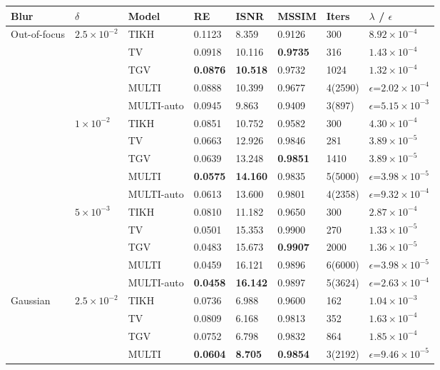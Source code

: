 \begin{tabular}{llllllll}
\toprule
Blur & $\delta$ & Model & RE & ISNR & MSSIM & Iters & $\lambda$ / $\epsilon$ \\
\midrule
\multirow{15}{*}{Out-of-focus} & \multirow{5}{*}{$2.5\times 10^{-2}$} & TIKH & 0.1123 & 8.359 & 0.9126 & 300 & $8.92\times 10^{-4}$ \\
 &  & TV & 0.0918 & 10.116 & \textbf{0.9735} & 316 & $1.43\times 10^{-4}$ \\
 &  & TGV & \textbf{0.0876} & \textbf{10.518} & 0.9732 & 1024 & $1.32\times 10^{-4}$ \\
 &  & MULTI & 0.0888 & 10.399 & 0.9677 & 4(2590) & $\epsilon$=$2.02\times 10^{-4}$ \\
 &  & MULTI-auto & 0.0945 & 9.863 & 0.9409 & 3(897) & $\epsilon$=$5.15\times 10^{-3}$ \\
\cmidrule{2-8}
 & \multirow{5}{*}{$1\times 10^{-2}$} & TIKH & 0.0851 & 10.752 & 0.9582 & 300 & $4.30\times 10^{-4}$ \\
 &  & TV & 0.0663 & 12.926 & 0.9846 & 281 & $3.89\times 10^{-5}$ \\
 &  & TGV & 0.0639 & 13.248 & \textbf{0.9851} & 1410 & $3.89\times 10^{-5}$ \\
 &  & MULTI & \textbf{0.0575} & \textbf{14.160} & 0.9835 & 5(5000) & $\epsilon$=$3.98\times 10^{-5}$ \\
 &  & MULTI-auto & 0.0613 & 13.600 & 0.9801 & 4(2358) & $\epsilon$=$9.32\times 10^{-4}$ \\
\cmidrule{2-8}
 & \multirow{5}{*}{$5\times 10^{-3}$} & TIKH & 0.0810 & 11.182 & 0.9650 & 300 & $2.87\times 10^{-4}$ \\
 &  & TV & 0.0501 & 15.353 & 0.9900 & 270 & $1.33\times 10^{-5}$ \\
 &  & TGV & 0.0483 & 15.673 & \textbf{0.9907} & 2000 & $1.36\times 10^{-5}$ \\
 &  & MULTI & 0.0459 & 16.121 & 0.9896 & 6(6000) & $\epsilon$=$3.98\times 10^{-5}$ \\
 &  & MULTI-auto & \textbf{0.0458} & \textbf{16.142} & 0.9897 & 5(3624) & $\epsilon$=$2.63\times 10^{-4}$ \\
\midrule
\multirow{15}{*}{Gaussian} & \multirow{5}{*}{$2.5\times 10^{-2}$} & TIKH & 0.0736 & 6.988 & 0.9600 & 162 & $1.04\times 10^{-3}$ \\
 &  & TV & 0.0809 & 6.168 & 0.9813 & 352 & $1.63\times 10^{-4}$ \\
 &  & TGV & 0.0752 & 6.798 & 0.9832 & 864 & $1.85\times 10^{-4}$ \\
 &  & MULTI & \textbf{0.0604} & \textbf{8.705} & \textbf{0.9854} & 3(2192) & $\epsilon$=$9.46\times 10^{-5}$ \\

\end{tabular}
